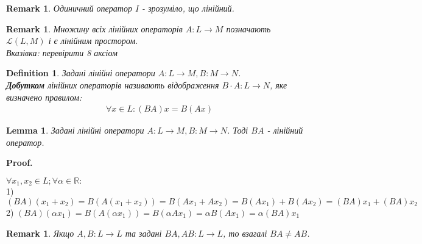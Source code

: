 \documentclass[a4paper, 10pt]{article}
\makeatletter
\theoremstyle{theoremdd}
\newtheorem{definition}[theorem]{Definition}
\newtheorem{remark}[theorem]{Remark}
\newtheorem{lemma}[theorem]{Lemma}
\renewenvironment{proof}[1][Proof.\\]{\par
\pushQED{\hfill \qed}%
\normalfont \topsep6\p@\@plus6\p@\relax
\trivlist
\item\relax
{\bfseries
#1\@addpunct{.}}\hspace\labelsep\ignorespaces
}{%
\popQED\endtrivlist\@endpefalse
}
\makeatother
\begin{document}
	\begin{remark}
	Одиничний оператор $I$ - зрозуміло, що лінійний.
	\end{remark}
	
	\begin{remark}
	Множину всіх лінійних операторів $A: L \to M$ позначають $\mathcal{L}(L,M)$ і є лінійним простором.\\
	\textit{Вказівка: перевірити 8 аксіом}
	\end{remark}
	
	\begin{definition}
	Задані лінійні оператори $A: L \to M, B: M \to N$.\\
	\textbf{Добутком} лінійних операторів називають відображення $B\cdot A: L \to N$, яке визначено правилом:
	\begin{align*}
	\forall x \in L: (BA)x = B(Ax)
	\end{align*}
	\end{definition}
	
	\begin{lemma}
	Задані лінійні оператори $A: L \to M, B: M \to N$. Тоді $BA$ - лінійний оператор.
	\end{lemma}
	
	\begin{proof}
	$\forall x_1, x_2 \in L; \forall \alpha \in \mathbb{R}:$\\
	1) $(BA)(x_1+x_2) = B(A(x_1+x_2)) = B(Ax_1+Ax_2)=B(Ax_1) + B(Ax_2)=(BA)x_1+(BA)x_2$\\
	2) $(BA)(\alpha x_1) = B(A(\alpha x_1)) = B(\alpha Ax_1) = \alpha B(Ax_1) = \alpha (BA)x_1$
	\end{proof}
	
	\begin{remark}
	Якщо $A,B: L \to L$ та задані $BA, AB: L \to L$, то взагалі $BA \neq AB$.
	\end{remark}
	
\end{document}
